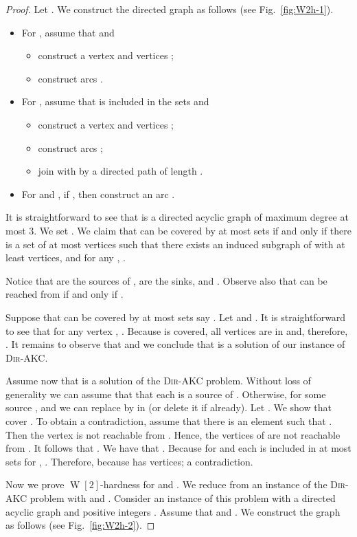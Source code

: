 \documentclass[11pt,a4paper]{article}
\DeclareMathOperator{\operatorClassW}{W}
\newcommand{\classW}[1]{\ensuremath{\operatorClassW[#1]}}
\newcommand{\DAKC}{\textsc{Dir-AKC}\xspace}
\begin{document}
\begin{proof}
Let . We construct the directed graph  as follows (see Fig.~\ref{fig:W2h-1}).
\begin{itemize}
\item For , assume that  and
\begin{itemize}
\item construct a vertex  and  vertices ;
\item construct arcs .
\end{itemize}
\item For , assume that  is included in the sets  and
\begin{itemize}
\item construct a vertex  and  vertices ;
\item construct arcs ;
\item join  with  by a directed path  of length .
\end{itemize}
\item For  and , if , then construct an arc .
\end{itemize}
It is straightforward to see that  is a directed acyclic graph of maximum degree at most 3. We set . We claim
that  can be covered by at most  sets if and only if there is a set of at most  vertices  such that there exists
an induced subgraph  of  with at least  vertices,  and for any , .

Notice that  are the sources of ,  are the sinks, and .
Observe also that  can be reached from  if and only if .

Suppose that  can be covered by at most  sets say . Let  and
. It is straightforward to see that for any vertex , . Because  is covered,
all vertices  are in  and, therefore, . It remains to observe
that  and we conclude that  is a solution of our instance of \DAKC.

Assume now that  is a solution of the \DAKC problem. Without loss of generality we can assume that that each 
is a source of . Otherwise,  for some source , and we can replace  by  in  (or delete it
if  already). Let . We show that 
cover . To obtain a contradiction, assume that there is an element  such that . Then the vertex  is not reachable from . Hence, the vertices of  are not reachable from . It
follows that . We have that . Because  for
 and each  is included in at most  sets for , . Therefore,  because  has  vertices; a
contradiction.

Now we prove \classW{2}-hardness for  and . We reduce from an instance of the \DAKC problem with 
and . Consider an instance of this problem with a directed acyclic graph  and positive integers . Assume
that  and . We construct the graph  as follows (see Fig.~\ref{fig:W2h-2}).


\end{proof}
\end{document}
